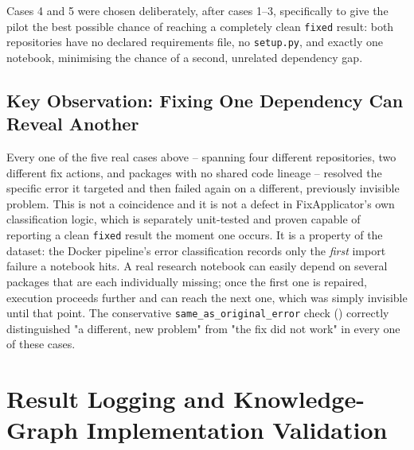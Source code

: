 Cases 4 and 5 were chosen deliberately, after cases 1--3, specifically to
give the pilot the best possible chance of reaching a completely clean
\texttt{fixed} result: both repositories have no declared requirements
file, no \texttt{setup.py}, and exactly one notebook, minimising the chance
of a second, unrelated dependency gap.

\subsection{Key Observation: Fixing One Dependency Can Reveal Another}
\label{sec:v-key-observation}

Every one of the five real cases above -- spanning four different
repositories, two different fix actions, and packages with no shared code
lineage -- resolved the specific error it targeted and then failed again on
a different, previously invisible problem. This is not a coincidence and it
is not a defect in FixApplicator's own classification logic, which is
separately unit-tested and proven capable of reporting a clean
\texttt{fixed} result the moment one occurs. It is a property of the
dataset: the Docker pipeline's error classification records only the
\emph{first} import failure a notebook hits. A real research notebook can
easily depend on several packages that are each individually missing; once
the first one is repaired, execution proceeds further and can reach the
next one, which was simply invisible until that point. The conservative
\texttt{same\_as\_original\_error} check ()
correctly distinguished "a different, new problem" from "the fix did not
work" in every one of these cases.


\section{Result Logging and Knowledge-Graph Implementation Validation}
\label{sec:v-i6}


